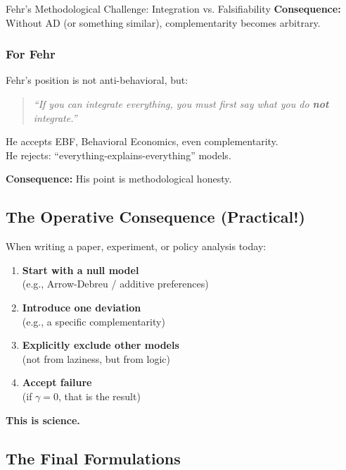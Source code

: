 \begin{chapter}{Fehr's Methodological Challenge: Integration vs. Falsifiability}
\textbf{Consequence:} Without AD (or something similar), complementarity becomes arbitrary.

\subsubsection{For Fehr}

Fehr's position is not anti-behavioral, but:

\begin{quote}
\textit{``If you can integrate everything, you must first say what you do \textbf{not} integrate.''}
\end{quote}

He accepts EBF, Behavioral Economics, even complementarity.\\
He rejects: ``everything-explains-everything'' models.

\textbf{Consequence:} His point is methodological honesty.

\subsection{The Operative Consequence (Practical!)}

When writing a paper, experiment, or policy analysis today:

\begin{enumerate}
    \item \textbf{Start with a null model}\\
    (e.g., Arrow-Debreu / additive preferences)

    \item \textbf{Introduce one deviation}\\
    (e.g., a specific complementarity)

    \item \textbf{Explicitly exclude other models}\\
    (not from laziness, but from logic)

    \item \textbf{Accept failure}\\
    (if $\gamma = 0$, that is the result)
\end{enumerate}

\textbf{This is science.}

\subsection{The Final Formulations}

\begin{tcolorbox}[colback=green!5!white,colframe=green!75!black,title=\textbf{Memorize These}]


\end{tcolorbox}
\end{chapter}
